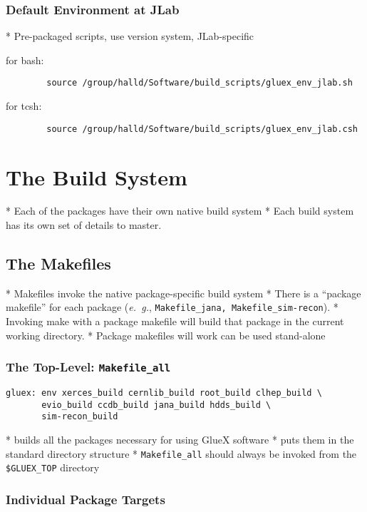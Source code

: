 \documentclass[12pt]{article}
\begin{document}
\subsubsection{Default Environment at JLab}

* Pre-packaged scripts, use version system, JLab-specific

for bash:
\begin{verbatim}
        source /group/halld/Software/build_scripts/gluex_env_jlab.sh
\end{verbatim}
for tcsh:
\begin{verbatim}
        source /group/halld/Software/build_scripts/gluex_env_jlab.csh
\end{verbatim}

\section{The Build System}

* Each of the packages have their own native build system
* Each build system has its own set of details to master.

\subsection{The Makefiles}

* Makefiles invoke the native package-specific build system
* There is a ``package makefile'' for each package ({\it e.~g.}, {\tt Makefile\_jana, Makefile\_sim-recon}).
* Invoking make with a package makefile will build that package in the current working directory.
* Package makefiles will work can be used stand-alone

\subsubsection{The Top-Level: {\tt Makefile\_all}}

\begin{verbatim}
gluex: env xerces_build cernlib_build root_build clhep_build \
       evio_build ccdb_build jana_build hdds_build \
       sim-recon_build
\end{verbatim}

* builds all the packages necessary for using GlueX software
* puts them in the standard directory structure
* {{\tt Makefile\_all}} should always be invoked from the {\tt \$GLUEX\_TOP} directory

\subsubsection{Individual Package Targets}
\end{document}
